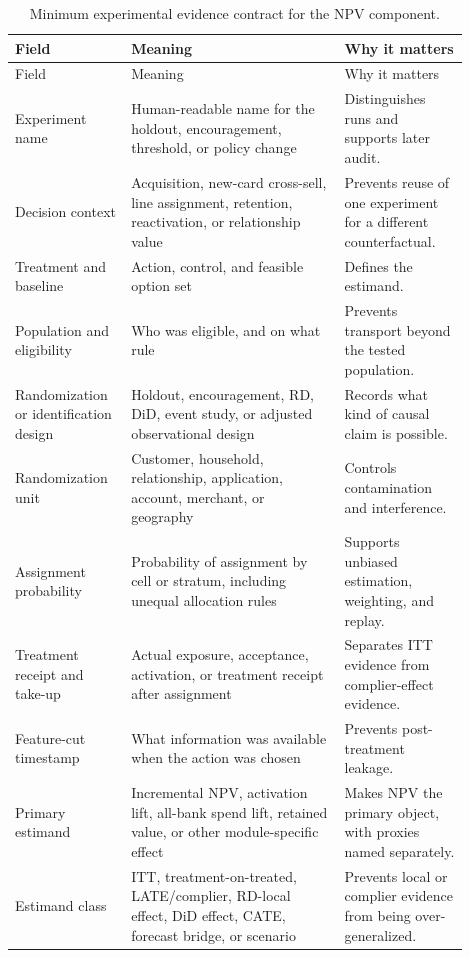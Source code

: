 \documentclass[11pt]{article}
\newcommand{\1}{\mathbf{1}}
\begin{document}
\begin{longtable}{L{0.22\linewidth}L{0.43\linewidth}L{0.25\linewidth}}
\caption{Minimum experimental evidence contract for the NPV component.}
\label{tab:experimental-contract}\\
\toprule
Field & Meaning & Why it matters \\
\midrule
\endfirsthead
\toprule
Field & Meaning & Why it matters \\
\midrule
\endhead
Experiment name
  & Human-readable name for the holdout, encouragement, threshold, or policy
    change
  & Distinguishes runs and supports later audit. \\
Decision context
  & Acquisition, new-card cross-sell, line assignment, retention, reactivation,
    or relationship value
  & Prevents reuse of one experiment for a different counterfactual. \\
Treatment and baseline
  & Action, control, and feasible option set
  & Defines the estimand. \\
Population and eligibility
  & Who was eligible, and on what rule
  & Prevents transport beyond the tested population. \\
Randomization or identification design
  & Holdout, encouragement, RD, DiD, event study, or adjusted observational
    design
  & Records what kind of causal claim is possible. \\
Randomization unit
  & Customer, household, relationship, application, account, merchant, or
    geography
  & Controls contamination and interference. \\
Assignment probability
  & Probability of assignment by cell or stratum, including unequal allocation
    rules
  & Supports unbiased estimation, weighting, and replay. \\
Treatment receipt and take-up
  & Actual exposure, acceptance, activation, or treatment receipt after
    assignment
  & Separates ITT evidence from complier-effect evidence. \\
Feature-cut timestamp
  & What information was available when the action was chosen
  & Prevents post-treatment leakage. \\
Primary estimand
  & Incremental NPV, activation lift, all-bank spend lift, retained value,
    or other module-specific effect
  & Makes NPV the primary object, with proxies named separately. \\
Estimand class
  & ITT, treatment-on-treated, LATE/complier, RD-local effect, DiD effect,
    CATE, forecast bridge, or scenario
  & Prevents local or complier evidence from being over-generalized. \\

\end{longtable}
\end{document}
